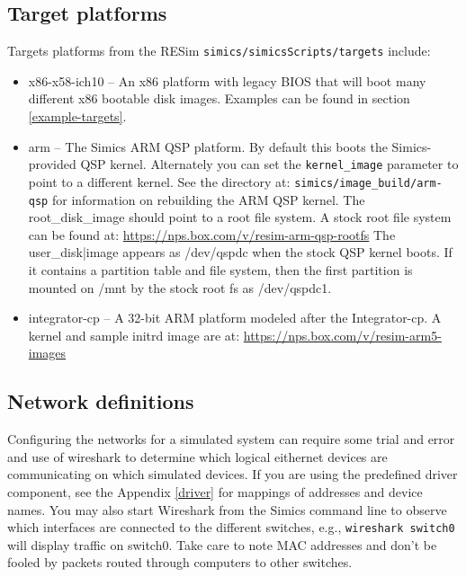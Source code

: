 \documentclass[titlepage]{article}
\begin{document}
\subsection{Target platforms}
\label{target-platforms}
Targets platforms from the RESim {\tt simics/simicsScripts/targets} include:
\begin{itemize}
\item x86-x58-ich10 -- An x86 platform with legacy BIOS that will boot many different x86 bootable disk images. Examples can be found in
section \ref{example-targets}.
\item arm -- The Simics ARM QSP platform.  By default this boots the Simics-provided QSP kernel.  Alternately you can set the {\tt kernel\_image} 
parameter to point to a different kernel.  See the directory at:
\newline
{\tt simics/image\_build/arm-qsp} for information on rebuilding the ARM QSP kernel.  The root\_disk\_image should point to a root file system.
A stock root file system can be found at: 
\newline
\url{https://nps.box.com/v/resim-arm-qsp-rootfs}
The user\_disk|image appears as /dev/qspdc when the stock QSP kernel boots.  If it contains a partition table and file system, then the first
partition is mounted on /mnt by the stock root fs as /dev/qspdc1.

\item integrator-cp -- A 32-bit ARM platform modeled after the Integrator-cp.  A kernel and sample initrd image are at:
\newline
\url{https://nps.box.com/v/resim-arm5-images}
\end{itemize}


\subsection{Network definitions}
\label{networks}
Configuring the networks for a simulated system can require some trial and error and use of wireshark to determine which
logical eithernet devices are communicating on which simulated devices.  If you are using the predefined driver component, see the 
Appendix \ref{driver} for mappings of addresses and device names.  You may also start Wireshark from the Simics command line to 
observe which interfaces are connected to the different switches, e.g., {\tt wireshark switch0} will display traffic on switch0.
Take care to note MAC addresses and don't be fooled by packets routed through computers to other switches.
\end{document}

